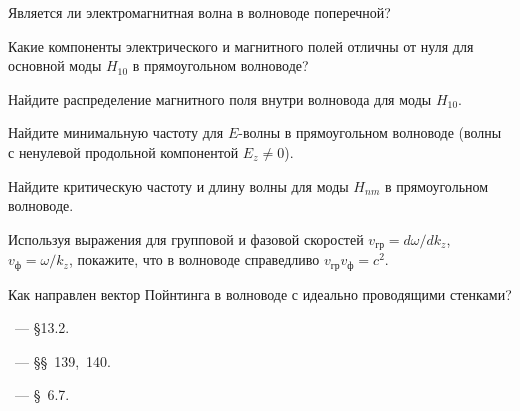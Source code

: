 \begin{lab:questions} 
    
    \item Является ли электромагнитная волна в волноводе поперечной?
    
    \item Какие компоненты электрического и магнитного полей отличны от нуля
для основной моды $H_{10}$ в прямоугольном волноводе?

    \item Найдите распределение магнитного поля внутри волновода для моды $H_{10}$.

    \item Найдите минимальную частоту для $E$-волны в прямоугольном волноводе (волны с ненулевой
    продольной компонентой $E_z\ne 0$).
    
    \item Найдите критическую частоту и длину волны для моды $H_{nm}$ в прямоугольном волноводе.
    
    \item Используя выражения для групповой и фазовой
    скоростей $v_{гр}=d\omega/dk_z$, $v_{\text{ф}}=\omega/k_z$, покажите, что в
    волноводе справедливо $v_{гр}v_{\text{ф}}=c^2$.
    
    \item Как направлен вектор Пойнтинга в волноводе с идеально проводящими стенками?
\end{lab:questions}


\begin{lab:literature} 
    \item \Kirichenko~--- \S 13.2.
    
    \item \SivuhinIII~--- \S\S~139,~140.
    
    \item \KingLokOlh~--- \S~6.7.
        
\end{lab:literature}